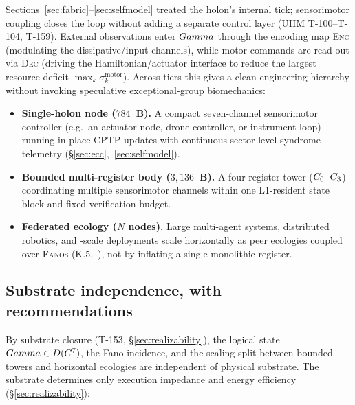 Sections~\ref{sec:fabric}--\ref{sec:selfmodel} treated the holon's internal
tick; sensorimotor coupling closes the loop without adding a separate control
layer (UHM T-100--T-104, T-159). External observations enter $Gamma$ through the
encoding map \textsc{Enc} (modulating the dissipative/input channels), while
motor commands are read out via \textsc{Dec} (driving the Hamiltonian/actuator
interface to reduce the largest resource deficit
$\max_k\sigma^{\mathrm{motor}}_k$). Across tiers this gives a clean engineering
hierarchy without invoking speculative exceptional-group biomechanics:
\begin{itemize}[leftmargin=1.5em,itemsep=1pt]
  \item \textbf{Single-holon node ($784$~B).} A compact seven-channel
        sensorimotor controller (e.g.\ an actuator node, drone controller, or
        instrument loop) running in-place CPTP updates with continuous
        sector-level syndrome telemetry (\S\ref{sec:ecc},~\ref{sec:selfmodel}).
  \item \textbf{Bounded multi-register body ($3{,}136$~B).} A four-register
        tower ($C_0$--$C_3$) coordinating multiple sensorimotor channels
        within one L1-resident state block and fixed verification budget.
  \item \textbf{Federated ecology ($N$ nodes).} Large multi-agent systems,
        distributed robotics, and \SYNARC{}-scale deployments scale horizontally
        as peer ecologies coupled over \textsc{Fanos} (K.5,~\cite{synarc2026}),
        not by inflating a single monolithic register.
\end{itemize}

\subsection{Substrate independence, with recommendations}
\label{subsec:substrate-ladder}

By substrate closure (T-153, \S\ref{sec:realizability}), the logical state
$Gamma\in D(C^7)$, the Fano incidence, and the scaling split between
bounded towers and horizontal ecologies are independent of physical substrate.
The substrate determines only execution impedance and energy efficiency
(\S\ref{sec:realizability}):


